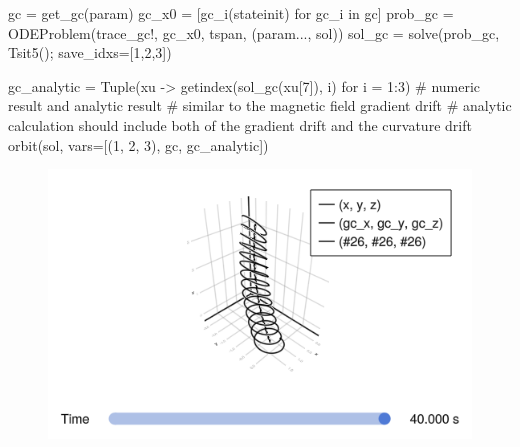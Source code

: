 \documentclass[
  a4paper,
  DIV=11]{scrreprt}
\newenvironment{Shaded}{\begin{snugshade}}{\end{snugshade}}
\newcommand{\CommentTok}[1]{\textcolor[rgb]{0.37,0.37,0.37}{#1}}
\newcommand{\ControlFlowTok}[1]{\textcolor[rgb]{0.00,0.23,0.31}{#1}}
\newcommand{\FloatTok}[1]{\textcolor[rgb]{0.68,0.00,0.00}{#1}}
\newcommand{\FunctionTok}[1]{\textcolor[rgb]{0.28,0.35,0.67}{#1}}
\newcommand{\KeywordTok}[1]{\textcolor[rgb]{0.00,0.23,0.31}{#1}}
\newcommand{\NormalTok}[1]{\textcolor[rgb]{0.00,0.23,0.31}{#1}}
\newcommand{\OperatorTok}[1]{\textcolor[rgb]{0.37,0.37,0.37}{#1}}
\begin{document}
\begin{Shaded}
\begin{Highlighting}[]
\NormalTok{gc }\OperatorTok{=} \FunctionTok{get\_gc}\NormalTok{(param)}
\NormalTok{gc\_x0 }\OperatorTok{=}\NormalTok{ [}\FunctionTok{gc\_i}\NormalTok{(stateinit) for gc\_i }\KeywordTok{in}\NormalTok{ gc]}
\NormalTok{prob\_gc }\OperatorTok{=} \FunctionTok{ODEProblem}\NormalTok{(trace\_gc!, gc\_x0, tspan, (param}\OperatorTok{...}\NormalTok{, sol))}
\NormalTok{sol\_gc }\OperatorTok{=} \FunctionTok{solve}\NormalTok{(prob\_gc, }\FunctionTok{Tsit5}\NormalTok{(); save\_idxs}\OperatorTok{=}\NormalTok{[}\FloatTok{1}\NormalTok{,}\FloatTok{2}\NormalTok{,}\FloatTok{3}\NormalTok{])}

\NormalTok{gc\_analytic }\OperatorTok{=} \FunctionTok{Tuple}\NormalTok{(xu }\OperatorTok{{-}\textgreater{}} \FunctionTok{getindex}\NormalTok{(}\FunctionTok{sol\_gc}\NormalTok{(xu[}\FloatTok{7}\NormalTok{]), i) }\ControlFlowTok{for}\NormalTok{ i }\OperatorTok{=} \FloatTok{1}\OperatorTok{:}\FloatTok{3}\NormalTok{)}
\CommentTok{\# numeric result and analytic result}
\CommentTok{\# similar to the magnetic field gradient drift}
\CommentTok{\# analytic calculation should include both of the gradient drift and the curvature drift}
\FunctionTok{orbit}\NormalTok{(sol, vars}\OperatorTok{=}\NormalTok{[(}\FloatTok{1}\NormalTok{, }\FloatTok{2}\NormalTok{, }\FloatTok{3}\NormalTok{), gc, gc\_analytic])}
\end{Highlighting}
\end{Shaded}

\begin{figure}[H]

{\centering \includegraphics{./Tutorial_files/figure-pdf/cell-8-output-1.png}

}

\end{figure}
\end{document}
